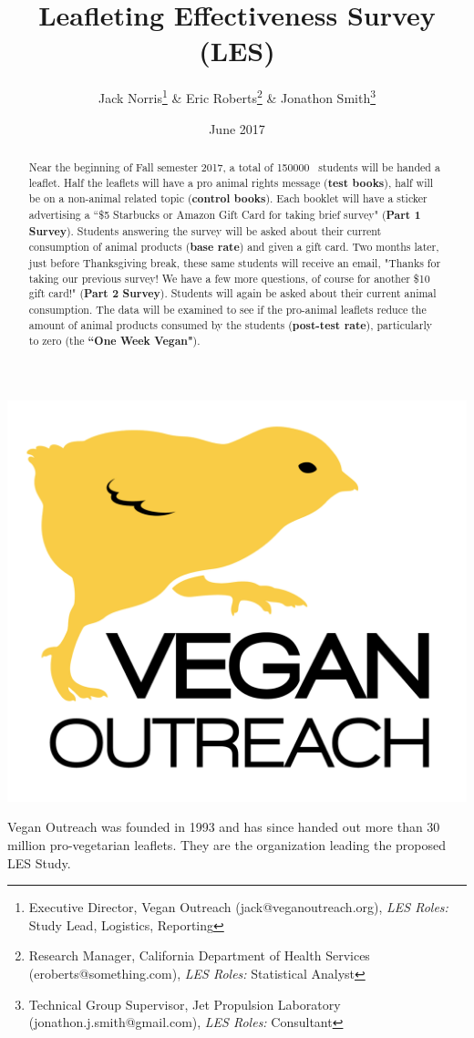 \documentclass{tufte-handout}
\title{Leafleting Effectiveness Survey (LES)}
\author[Jack Norris \& Eric Roberts \& Jonathon Smith]{Jack Norris\thanks{Executive Director, Vegan Outreach (jack@veganoutreach.org), \textit{LES Roles:} Study Lead, Logistics, Reporting } \& Eric Roberts\thanks{Research Manager, California Department of Health Services (eroberts@something.com), \textit{LES Roles:} Statistical Analyst} \& Jonathon Smith\thanks{Technical Group Supervisor, Jet Propulsion Laboratory (jonathon.j.smith@gmail.com), \textit{LES Roles:} Consultant}}
\date{June 2017} %
\newcommand{\totalbooklets}[0]{\textsc{150000}}
\begin{document}
\maketitle%


\begin{abstract}
\noindent

Near the beginning of Fall semester 2017, a total of \totalbooklets~ 
students will be handed a leaflet. Half the leaflets will have a
pro animal rights message (\textbf{test books}), half will be on a
non-animal related topic (\textbf{control books}). Each booklet will have a
sticker advertising a ``\$5 Starbucks or Amazon Gift Card for taking
brief survey" (\textbf{Part 1 Survey}). Students answering the survey will be 
asked about their current consumption of animal products (\textbf{base rate}) 
and given a gift card. Two months later, just before Thanksgiving 
break, these same students will receive an email, "Thanks for taking 
our previous survey! We have a few more questions, of course for 
another \$10 gift card!" (\textbf{Part 2 Survey}). Students will again
be asked about their current animal consumption. The data will
be examined to see if the pro-animal leaflets reduce the amount of
animal products consumed by the students (\textbf{post-test rate}), 
particularly to zero (the \textbf{``One Week Vegan"}). 

\end{abstract}

\begin{marginfigure}[0 in]%
  \raggedleft
  \includegraphics[width=\textwidth]{vologo.png}
  \caption{Vegan Outreach was founded in 1993 and has since handed out more
  than 30 million pro-vegetarian leaflets. They are the organization leading 
  the proposed LES Study.}
  \label{fig:vologo}
\end{marginfigure}
  
\end{document}
